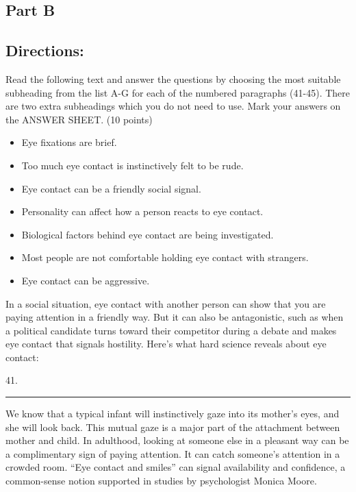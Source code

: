 \documentclass[UTF8,11pt]{ctexart}
\begin{document}
\subsection*{\textbf{Part B}}


\subsection*{\textbf{Directions:}}


Read the following text and answer the questions by choosing the most suitable subheading from the list A-G for each of the numbered paragraphs (41-45). There are two extra subheadings which you do not need to use. Mark your answers on the ANSWER SHEET. (10 points)


\begin{itemize}[leftmargin=2em,itemsep=.2em,topsep=.4em]\item[A.] Eye fixations are brief.
\item[B.] Too much eye contact is instinctively felt to be rude.
\item[C.] Eye contact can be a friendly social signal.
\item[D.] Personality can affect how a person reacts to eye contact.
\item[E.] Biological factors behind eye contact are being investigated.
\item[F.] Most people are not comfortable holding eye contact with strangers.
\item[G.] Eye contact can be aggressive.
\end{itemize}

In a social situation, eye contact with another person can show that you are paying attention in a friendly way. But it can also be antagonistic, such as when a political candidate turns toward their competitor during a debate and makes eye contact that signals hostility. Here’s what hard science reveals about eye contact:


41. \par\noindent\rule{.95\linewidth}{.4pt}\par


We know that a typical infant will instinctively gaze into its mother’s eyes, and she will look back. This mutual gaze is a major part of the attachment between mother and child. In adulthood, looking at someone else in a pleasant way can be a complimentary sign of paying attention. It can catch someone’s attention in a crowded room. “Eye contact and smiles” can signal availability and confidence, a common-sense notion supported in studies by psychologist Monica Moore.
\end{document}

